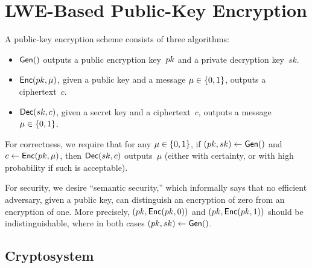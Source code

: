 \documentclass[11pt]{article}
\begin{document}
\section{LWE-Based Public-Key Encryption}
\label{sec:lwe-pke}

A public-key encryption scheme consists of three algorithms:
\begin{itemize}
\item $\mathsf{Gen}()$ outputs a public encryption key~$pk$ and a private
  decryption key~$sk$.
\item $\mathsf{Enc}(pk,\mu)$, given a public key and a message
  $\mu \in \{0,1\}$, outputs a ciphertext~$c$.
\item $\mathsf{Dec}(sk,c)$, given a secret key and a ciphertext~$c$,
  outputs a message $\mu \in \{0,1\}$.
\end{itemize}

For correctness, we require that for any $\mu \in \{0,1\}$, if
$(pk,sk) \gets \mathsf{Gen}()$ and $c \gets \mathsf{Enc}(pk,\mu)$, then
$\mathsf{Dec}(sk,c)$ outputs~$\mu$ (either with certainty, or with high
probability if such is acceptable).

For security, we desire ``semantic security,'' which informally says
that no efficient adversary, given a public key, can distinguish an
encryption of zero from an encryption of one. More precisely,
$(pk,\mathsf{Enc}(pk,0))$ and $(pk,\mathsf{Enc}(pk,1))$ should be
indistinguishable, where in both cases $(pk,sk) \gets \mathsf{Gen}()$.

\subsection{Cryptosystem}
\label{sec:cryptosystem}
\end{document}
